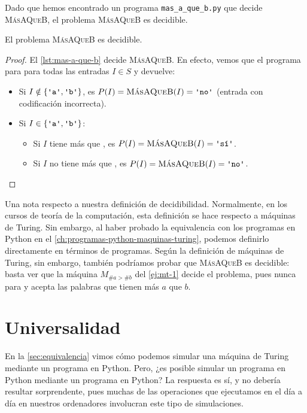 Dado que hemos encontrado un programa \texttt{mas\_a\_que\_b.py} que decide \textsc{MásAQueB}, el problema \textsc{MásAQueB} es decidible.

\begin{proposicion}\label{prop:masaqueb-decidible}
El problema \textsc{MásAQueB} es decidible.
\end{proposicion}
\begin{proof}
El \cref{lst:mas-a-que-b} decide \textsc{MásAQueB}. En efecto, vemos que el programa para para todas las entradas $I\in S$ y devuelve:
\begin{itemize}
    \item Si $I \notin \{\palabra{a}, \palabra{b}\}$, es $P(I)=\textsc{MásAQueB}(I)=\palabra{no}$ (entrada con codificación incorrecta).
    \item Si $I \in \{\palabra{a}, \palabra{b}\}$:
    \begin{itemize}
        \item Si $I$ tiene más  que , es $P(I)=\textsc{MásAQueB}(I)=\palabra{sí}$.
        \item Si $I$ no tiene más  que , es $P(I)=\textsc{MásAQueB}(I)=\palabra{no}$.
    \end{itemize}
\end{itemize}
\end{proof}

Una nota respecto a nuestra definición de decidibilidad. Normalmente, en los cursos de teoría de la computación, esta definición se hace respecto a máquinas de Turing. Sin embargo, al haber probado la equivalencia con los programas en Python en el \cref{ch:programas-python-maquinas-turing}, podemos definirlo directamente en términos de programas. Según la definición de máquinas de Turing, sin embargo, también podríamos probar que \textsc{MásAQueB} es decidible: basta ver que la máquina $M_{\#a>\#b}$ del \cref{ej:mt-1} decide el problema, pues nunca para y acepta las palabras que tienen más $a$ que $b$.

\section{Universalidad}\label{sec:universalidad}

En la \cref{sec:equivalencia} vimos cómo podemos simular una máquina de Turing mediante un programa en Python. Pero, ¿es posible simular un programa en Python mediante un programa en Python? La respuesta es sí, y no debería resultar sorprendente, pues muchas de las operaciones que ejecutamos en el día a día en nuestros ordenadores involucran este tipo de simulaciones.

